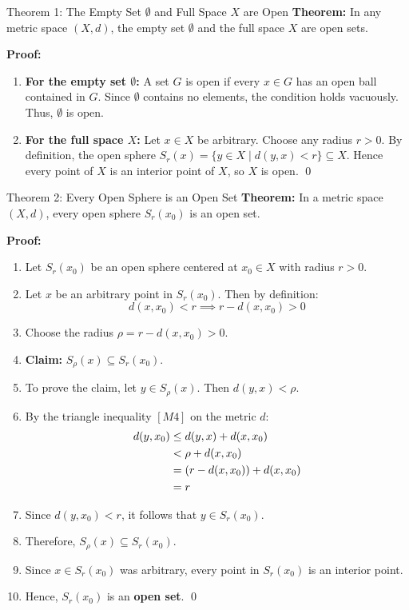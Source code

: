 \documentclass[11pt,a4paper]{article}
\begin{document}
\begin{exbox}{Theorem 1: The Empty Set $\emptyset$ and Full Space $X$ are Open}
\textbf{Theorem:} In any metric space $(X, d)$, the empty set $\emptyset$ and the full space $X$ are open sets.

\textbf{Proof:}
\begin{enumerate}
    \item \textbf{For the empty set $\emptyset$:} A set $G$ is open if every $x \in G$ has an open ball contained in $G$. Since $\emptyset$ contains no elements, the condition holds vacuously. Thus, $\emptyset$ is open.
    \item \textbf{For the full space $X$:} Let $x \in X$ be arbitrary. Choose any radius $r > 0$. By definition, the open sphere $S_r(x) = \{y \in X \mid d(y, x) < r\} \subseteq X$. Hence every point of $X$ is an interior point of $X$, so $X$ is open. \qed
\end{enumerate}
\end{exbox}

\begin{exbox}{Theorem 2: Every Open Sphere is an Open Set}
\textbf{Theorem:} In a metric space $(X, d)$, every open sphere $S_r(x_0)$ is an open set.

\textbf{Proof:}
\begin{enumerate}
    \item Let $S_r(x_0)$ be an open sphere centered at $x_0 \in X$ with radius $r > 0$.
    \item Let $x$ be an arbitrary point in $S_r(x_0)$. Then by definition:
    \begin{equation}
        d(x, x_0) < r \implies r - d(x, x_0) > 0
    \end{equation}
    \item Choose the radius $\rho = r - d(x, x_0) > 0$.
    \item \textbf{Claim:} $S_\rho(x) \subseteq S_r(x_0)$.
    \item To prove the claim, let $y \in S_\rho(x)$. Then $d(y, x) < \rho$.
    \item By the triangle inequality $[M4]$ on the metric $d$:
    \begin{align}
        d(y, x_0) &\le d(y, x) + d(x, x_0) \notag \\
        &< \rho + d(x, x_0) \notag \\
        &= (r - d(x, x_0)) + d(x, x_0) \notag \\
        &= r
    \end{align}
    \item Since $d(y, x_0) < r$, it follows that $y \in S_r(x_0)$.
    \item Therefore, $S_\rho(x) \subseteq S_r(x_0)$.
    \item Since $x \in S_r(x_0)$ was arbitrary, every point in $S_r(x_0)$ is an interior point.
    \item Hence, $S_r(x_0)$ is an \textbf{open set}. \qed
\end{enumerate}
\end{exbox}
\end{document}
